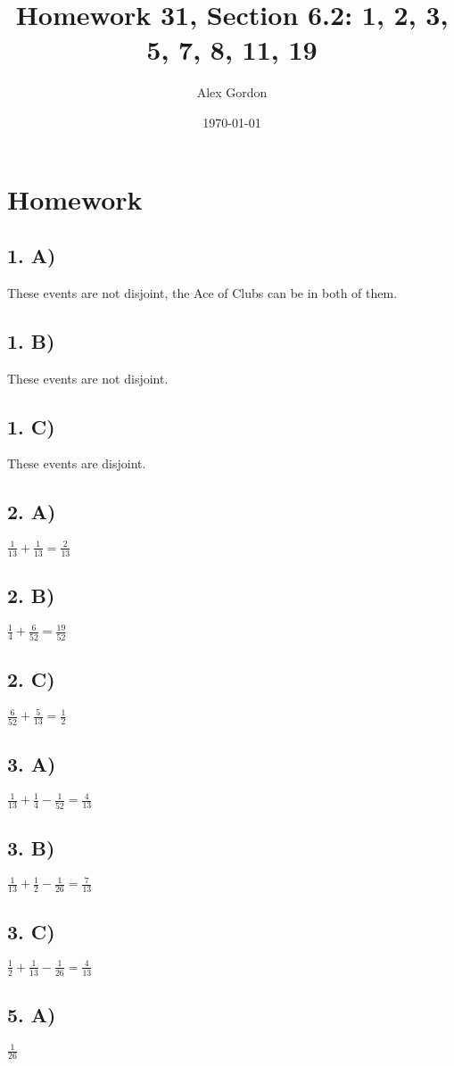 \documentclass[12]{scrartcl}
\begin{document}
\title{Homework 31, Section 6.2: 1, 2, 3, 5, 7, 8, 11, 19}
\author{Alex Gordon}
\date{\today}
\maketitle
\section*{Homework}
\subsection*{1. A)}
These events are not disjoint, the Ace of Clubs can be in both of them. 
\subsection*{1. B)}
These events are not disjoint.
\subsection*{1. C)}
These events are disjoint.
\subsection*{2. A)}
$\frac{1}{13} + \frac{1}{13} = \frac{2}{13}$
\subsection*{2. B)}
$\frac{1}{4} + \frac{6}{52} = \frac{19}{52}$
\subsection*{2. C)}
$\frac{6}{52} + \frac{5}{13} = \frac{1}{2}$
\subsection*{3. A)}
$\frac{1}{13} + \frac{1}{4} - \frac{1}{52} = \frac{4}{13}$
\subsection*{3. B)}
$\frac{1}{13} + \frac{1}{2} - \frac{1}{26} = \frac{7}{13}$
\subsection*{3. C)}
$\frac{1}{2} + \frac{1}{13} - \frac{1}{26} = \frac{4}{13}$
\subsection*{5. A)}
$\frac{1}{26} $
\end{document}
